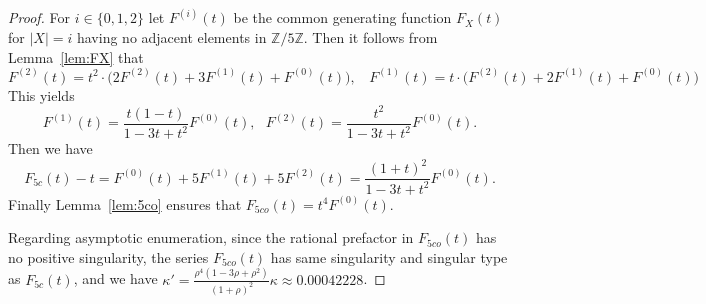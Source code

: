 \documentclass[10pt,a4paper]{amsart}
\def\Ffc{F_{5c}}
\def\Ffco{F_{5co}}
\begin{document}
\begin{proof}
For $i\in\{0,1,2\}$ let $F^{(i)}(t)$ be the common generating function $F_X(t)$ for $|X|=i$
having no adjacent elements in $\mathbb{Z}/5\mathbb{Z}$. Then it follows from Lemma~\ref{lem:FX}
that
\[
F^{(2)}(t)=t^2\cdot\big(2F^{(2)}(t)+3F^{(1)}(t)+F^{(0)}(t)\big),\ \ \ \ F^{(1)}(t)=t\cdot\big(F^{(2)}(t)+2F^{(1)}(t)+F^{(0)}(t)\big) 
\]
This yields
\[
F^{(1)}(t)=\frac{t(1-t)}{1-3t+t^2}F^{(0)}(t),\ \ \ F^{(2)}(t)=\frac{t^2}{1-3t+t^2}F^{(0)}(t).
\]
Then we have
\[
\Ffc(t)-t=F^{(0)}(t)+5F^{(1)}(t)+5F^{(2)}(t)=\frac{(1+t)^2}{1-3t+t^2}F^{(0)}(t).
\]
Finally Lemma~\ref{lem:5co} ensures that $\Ffco(t)=t^4F^{(0)}(t)$. 

Regarding asymptotic enumeration, since the rational prefactor in $\Ffco(t)$ has no positive singularity, the series $\Ffco(t)$ has same singularity and singular type as $\Ffc(t)$, and we have $\kappa'=\frac{\rho^4(1-3\rho+\rho^2)}{(1+\rho)^2}\kappa\approx 0.00042228$.  
\end{proof}
\end{document}
